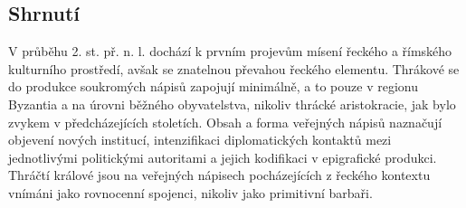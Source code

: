 
\subsection[shrnutí-11]{Shrnutí}

V průběhu 2. st. př. n. l. dochází k prvním projevům mísení řeckého a římského kulturního prostředí, avšak se znatelnou převahou řeckého elementu. Thrákové se do produkce soukromých nápisů zapojují minimálně, a to pouze v regionu Byzantia a na úrovni běžného obyvatelstva, nikoliv thrácké aristokracie, jak bylo zvykem v předcházejících stoletích. Obsah a forma veřejných nápisů naznačují objevení nových institucí, intenzifikaci diplomatických kontaktů mezi jednotlivými politickými autoritami a jejich kodifikaci v epigrafické produkci. Thráčtí králové jsou na veřejných nápisech pocházejících z řeckého kontextu vnímáni jako rovnocenní spojenci, nikoliv jako primitivní barbaři.

